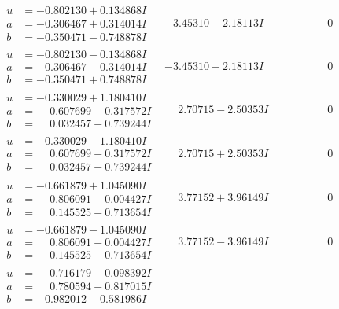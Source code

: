 \documentclass[1p]{elsarticle_modified}
\theoremstyle{definition}
\begin{document}
$$\begin{array}{c|c|c}
\begin{aligned}
u &= -0.802130 + 0.134868 I \\
a &= -0.306467 + 0.314014 I \\
b &= -0.350471 - 0.748878 I\end{aligned}
 & -3.45310 + 2.18113 I & \phantom{-0.000000 } 0 \\ \hline\begin{aligned}
u &= -0.802130 - 0.134868 I \\
a &= -0.306467 - 0.314014 I \\
b &= -0.350471 + 0.748878 I\end{aligned}
 & -3.45310 - 2.18113 I & \phantom{-0.000000 } 0 \\ \hline\begin{aligned}
u &= -0.330029 + 1.180410 I \\
a &= \phantom{-}0.607699 - 0.317572 I \\
b &= \phantom{-}0.032457 - 0.739244 I\end{aligned}
 & \phantom{-}2.70715 - 2.50353 I & \phantom{-0.000000 } 0 \\ \hline\begin{aligned}
u &= -0.330029 - 1.180410 I \\
a &= \phantom{-}0.607699 + 0.317572 I \\
b &= \phantom{-}0.032457 + 0.739244 I\end{aligned}
 & \phantom{-}2.70715 + 2.50353 I & \phantom{-0.000000 } 0 \\ \hline\begin{aligned}
u &= -0.661879 + 1.045090 I \\
a &= \phantom{-}0.806091 + 0.004427 I \\
b &= \phantom{-}0.145525 - 0.713654 I\end{aligned}
 & \phantom{-}3.77152 + 3.96149 I & \phantom{-0.000000 } 0 \\ \hline\begin{aligned}
u &= -0.661879 - 1.045090 I \\
a &= \phantom{-}0.806091 - 0.004427 I \\
b &= \phantom{-}0.145525 + 0.713654 I\end{aligned}
 & \phantom{-}3.77152 - 3.96149 I & \phantom{-0.000000 } 0 \\ \hline\begin{aligned}
u &= \phantom{-}0.716179 + 0.098392 I \\
a &= \phantom{-}0.780594 - 0.817015 I \\
b &= -0.982012 - 0.581986 I\end{aligned}

\end{array}$$
\end{document}
